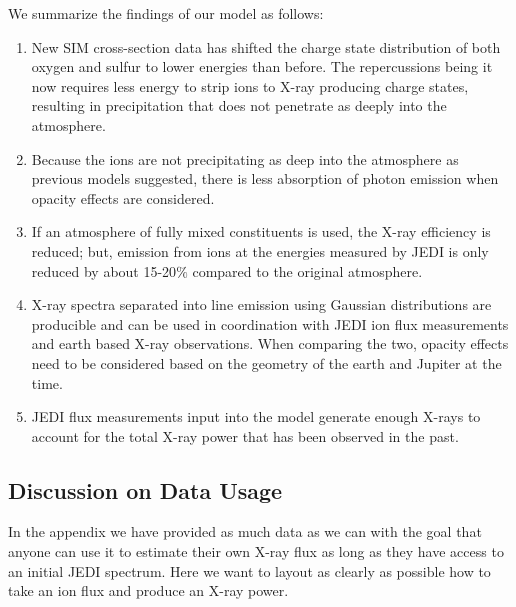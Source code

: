 \documentclass[draft]{agujournal2018}
\begin{document}
We summarize the findings of our model as follows:
\begin{enumerate}
    \item New SIM cross-section data has shifted the charge state distribution of both oxygen and sulfur to lower energies than before.
    The repercussions being it now requires less energy to strip ions to X-ray producing charge states, resulting in precipitation that does not penetrate as deeply into the atmosphere.
    \item Because the ions are not precipitating as deep into the atmosphere as previous models suggested, there is less absorption of photon emission when opacity effects are considered.
    \item If an atmosphere of fully mixed constituents is used, the X-ray efficiency is reduced; but, emission from ions at the energies measured by JEDI is only reduced by about 15-20$\%$ compared to the original atmosphere.
    \item X-ray spectra separated into line emission using Gaussian distributions are producible and can be used in coordination with JEDI ion flux measurements and earth based X-ray observations.
    When comparing the two, opacity effects need to be considered based on the geometry of the earth and Jupiter at the time.
    \item JEDI flux measurements input into the model generate enough X-rays to account for the total X-ray power that has been observed in the past.
\end{enumerate}

\subsection{Discussion on Data Usage}

In the appendix we have provided as much data as we can with the goal that anyone can use it to estimate their own X-ray flux as long as they have access to an initial JEDI spectrum.
Here we want to layout as clearly as possible how to take an ion flux and produce an X-ray power.
\end{document}
